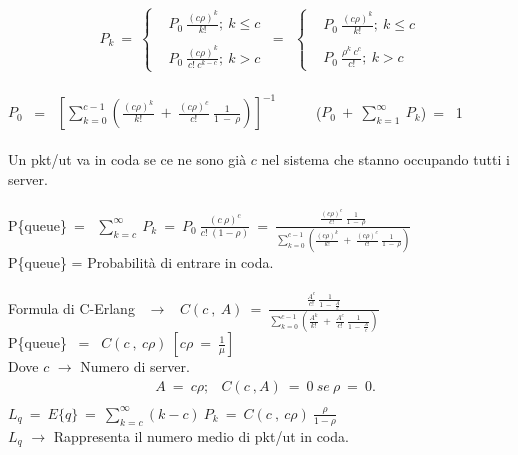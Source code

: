 \documentclass[12pt,a4paper]{article}
\begin{document}
    \begin{align*}
    P_{k} \ = \
    \begin{cases}
     &P_{0} \ \frac{(c\rho)^{k}}{k!};\ k \le c\\ \\
     &P_{0} \ \frac{(c\rho)^{k}}{c! \ c^{k-c}}; \ k > c
     \end{cases}
     \ = \ \
    \begin{cases}
     &P_{0} \ \frac{(c\rho)^{k}}{k!};\ k \le c\\ \\
     &P_{0} \ \frac{\rho^{k} \ c^{c}}{c!}; \ k > c
    \end{cases}
    \end{align*} \\
    $P_{0}$ \ = \ $[\sum^{c-1}_{k=0}(\frac{(c\rho)^{k}}{k!} \ + \ \frac{(c\rho)^{c}}{c!} \ \frac{1}{1 \ - \ \rho})]^{-1}$ \ \ \ \ \ ($P_{0} \ + \ \sum^{\infty}_{k=1} \ P_{k}$)\ = \ 1 \\ \\
    Un pkt/ut va in coda se ce ne sono già $c$ nel sistema che stanno occupando tutti i server. \\ \\
    P\{queue\}\ = \ $\sum^{\infty}_{k=c} \ P_{k}\ = \ P_{0} \ \frac{(c \ \rho)^{c}}{c! \ (1 - \rho)} \ = \ \frac{\frac{(c \rho)^{c}}{c!} \ \frac{1}{1 \ - \ \rho}}{\sum^{c-1}_{k=0}(\frac{(c \rho)^{k}}{k!} \ + \ \frac{(c \rho)^{c}}{c!} \ \frac{1}{1 \ - \ \rho})}$ \\ 
     P\{queue\} = Probabilità di entrare in coda.\\ \\
    Formula di C-Erlang \ $\rightarrow$ \ $C(c \ , \ A) \ = \ \frac{\frac{A^{c}}{c!} \ \frac{1}{1 \ - \ \frac{A}{c}}}{\sum^{c-1}_{k=0}(\frac{A^{k}}{k!}\ + \ \frac{A^{c}}{c!} \ \frac{1}{1 \ - \ \frac{A}{c}})}$ \\
    P\{queue\} \ = \ $C(c \ , \ c\rho) \ [c\rho \ = \ \frac{1}{\mu}]$ \\ 
    Dove $c$ $\rightarrow$ Numero di server. \\ 
    \begin{align*}
    &A \ = \ c\rho; 
    &C(c \ , A) \ = \ 0 \ se \ \rho \ = \ 0. \\
    \end{align*}
    $L_{q} \ = \ E\{q\} \ = \ \sum^{\infty}_{k=c}(k-c) \ P_{k} \ = \ C(c \ , \ c\rho) \ \frac{\rho}{1-\rho}$ \\ 
    $L_{q}$ $\rightarrow$ Rappresenta il numero medio di pkt/ut in coda.\\
\end{document}
